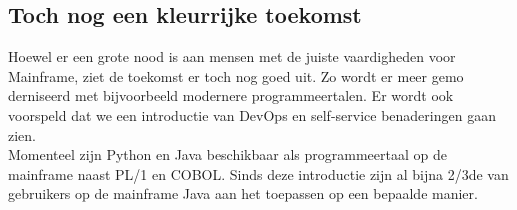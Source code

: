 \subsection{Toch nog een kleurrijke toekomst}
Hoewel er een grote nood is aan mensen met de juiste vaardigheden voor Mainframe, ziet de toekomst er toch nog goed uit. Zo wordt er meer gemo derniseerd met bijvoorbeeld modernere programmeertalen. Er wordt ook voorspeld dat we een introductie van DevOps en self-service benaderingen gaan zien. \autocite{Pennaz2023} \\
Momenteel zijn Python en Java beschikbaar als programmeertaal op de mainframe naast PL/1 en COBOL.
Sinds deze introductie zijn al bijna 2/3de van gebruikers op de mainframe Java aan het toepassen op een bepaalde manier. \autocite{Watts2018} 





\lipsum[7-20]
